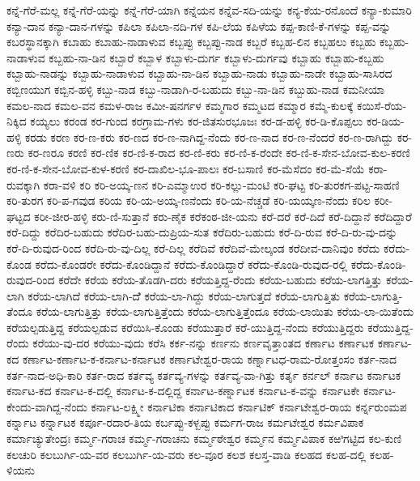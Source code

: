 {ಕನ್ನೆ-ಗೆರೆ-ಮಲ್ಲ
ಕನ್ನೆ-ಗೆರೆ-ಯನ್ನು
ಕನ್ನೆ-ಗೆರೆ-ಯಾಗಿ
ಕನ್ನೆಯನ
ಕನ್ನೆವ-ಸದಿ-ಯನ್ನು
ಕನ್ಯ-ಕೆಯ-ರನೊಂದೆ
ಕನ್ಯಾ-ಕುಮಾರಿ
ಕನ್ಯಾ-ದಾನ
ಕನ್ಯಾ-ದಾನ-ಗಳನ್ನು
ಕಪಿಲಾ
ಕಪಿಲಾ-ನದಿ-ಗಳ
ಕಪಿ-ಲೆಯ
ಕಪಿಳೆಯ
ಕಪ್ಪ-ಕಾಣಿ-ಕೆ-ಗಳನ್ನು
ಕಪ್ಪ-ವನ್ನು
ಕಬರಸ್ಥಾನಕ್ಕಾಗಿ
ಕಬಾಹು
ಕಬಾಹು-ನಾಡಾಳುವ
ಕಬ್ಬಪ್ಪು
ಕಬ್ಬಪ್ಪು-ನಾಡ
ಕಬ್ಬರೆ
ಕಬ್ಬಹ-ಲಿನ
ಕಬ್ಬಹಲು
ಕಬ್ಬಹು
ಕಬ್ಬಹು-ನಾಡಾಳುವ
ಕಬ್ಬಹು-ನಾ-ಡಿನ
ಕಬ್ಬಾರೆ
ಕಬ್ಬಾಳ
ಕಬ್ಬಾಳು-ದುರ್ಗ
ಕಬ್ಬಾಳು-ದುರ್ಗವು
ಕಬ್ಬಾಹು
ಕಬ್ಬಾಹು-ಕಬ್ಬಹು
ಕಬ್ಬಾಹು-ನಾಡನ್ನು
ಕಬ್ಬಾಹು-ನಾಡಾಳುವ
ಕಬ್ಬಾಹು-ನಾ-ಡಿನ
ಕಬ್ಬಾಹು-ನಾಡು
ಕಬ್ಬಾಹು-ನಾಡೇ
ಕಬ್ಬಾಹು-ಸಾಸಿರದ
ಕಬ್ಬಿಣಯುಗ
ಕಬ್ಬಿನ-ಹಳ್ಳಿ
ಕಬ್ಬು-ನಾಡ
ಕಬ್ಬು-ನಾಡಾಗಿ-ರ-ಬಹುದು
ಕಬ್ಬು-ನಾ-ಡಿನ
ಕಬ್ಬುಹು-ನಾಡ
ಕಮನೀಯಾ
ಕಮಲ-ನಾದ
ಕಮಲ-ವನ
ಕಮಳ-ರಾಜ
ಕಮೀ-ಷನರ್ಗಳ
ಕಮ್ಮಗಾರ
ಕಮ್ಮಟದ
ಕಮ್ಮಾರ
ಕಮ್ಮೆ-ಕುಲಕ್ಕೆ
ಕಯಿಸೆ-ರೆಯ-ನಿಕ್ಕಿದ
ಕಯ್ಯಲು
ಕರಂಡ
ಕರ-ಗುಂದ
ಕರಗ್ರಾಮ-ಗಳು
ಕರ-ಜಿತಸುರಭೂಜಃ
ಕರ-ಡ-ಹಳ್ಳಿ
ಕರ-ಡಿ-ಕೊಪ್ಪಲು
ಕರ-ಡಿಯ-ಹಳ್ಳಿ
ಕರಡು
ಕರಣ
ಕರ-ಣ-ಕರು
ಕರ-ಣದ
ಕರ-ಣ-ನಾಗಿದ್ದ-ನೆಂದು
ಕರ-ಣ-ನಾದ
ಕರ-ಣ-ನೆಂದರೆ
ಕರ-ಣ-ರಾಗಿದ್ದು
ಕರ-ಣರು
ಕರ-ಣರೂ
ಕರಣಿ
ಕರ-ಣಿಕ
ಕರ-ಣಿ-ಕ-ರಾದ
ಕರ-ಣಿ-ಕರು
ಕರ-ಣಿ-ಕ-ರೆಂದೇ
ಕರ-ಣಿ-ಕ-ಸೇನ-ಬೋವ-ಕುಲ-ಕರಣಿ
ಕರ-ಣಿ-ಕ-ಸೇನ-ಬೋವ-ಕುಳ-ಕರಣಿ
ಕರ-ದಾಖಿಲ-ಭೂ-ಪಾಲಃ
ಕರ-ಬಸಾಣಿ
ಕರ-ಮೆಸೆದಂ
ಕರ-ಮೆ-ಸೆಯೆ
ಕರಾ-ರುವಕ್ಕಾಗಿ
ಕರಾ-ವಳಿ
ಕರಿ
ಕರಿ-ಅಯ್ಕ-ಣನ
ಕರಿ-ಎಮ್ಮಾಉರ
ಕರಿ-ಕಲ್ಲು-ಮಂಟಿ
ಕರಿ-ಘಟ್ಟ
ಕರಿ-ತುರಕಗ-ಪಟ್ಟ-ಸಾಹಣಿ
ಕರಿ-ತುರಗ
ಕರಿ-ಪ-ಗವುಡ
ಕರಿಯ
ಕರಿ-ಯ-ಅಯ್ಕ-ಣನೆಂದು
ಕರಿ-ಯ-ನೆಚ್ಚಡೆ
ಕರಿ-ಯಯ್ಕಣ-ನೆಂದು
ಕರಿಲ
ಕರೀ-ಘಟ್ಟದ
ಕರೀ-ಜೀರ-ಹಳ್ಳಿ
ಕರು-ಣಿ-ಸುತ್ತಾನೆ
ಕರು-ಣೈಕ
ಕರೆಕಂಠ-ಜೀ-ಯನು
ಕರೆ-ದರೆ
ಕರೆ-ದಿದೆ
ಕರೆ-ದಿದ್ದಾನೆ
ಕರೆದಿದ್ದಾರೆ
ಕರೆ-ದಿದ್ದು
ಕರೆದಿರ-ಬಹುದು
ಕರೆದಿರ-ಬಹು-ದುಪ್ರಿಯ-ಸುತ
ಕರೆದಿರು-ಬಹುದು
ಕರೆ-ದಿ-ರುವ
ಕರೆ-ದಿ-ರು-ವು-ದನ್ನು
ಕರೆ-ದಿ-ರುವುದ-ರಿಂದ
ಕರೆದಿ-ರು-ವು-ದಿಲ್ಲ
ಕರೆ-ದಿಲ್ಲ
ಕರೆದಿವೆ
ಕರೆದಿವೆ-ಮೇಲ್ಕಂಡ
ಕರೆದೀವ-ದಾನಿವುಂ
ಕರೆದು
ಕರೆದು-ಕೊಂಡ
ಕರೆದು-ಕೊಂಡರೇ
ಕರೆದು-ಕೊಂಡಿದ್ದಾನೆ
ಕರೆದು-ಕೊಂಡಿದ್ದಾರೆ
ಕರೆದು-ಕೊಂಡಿ-ರುವುದ-ರಲ್ಲಿ
ಕರೆದು-ಕೊಂಡಿ-ರುವುದ-ರಿಂದ
ಕರೆದೇ
ಕರೆಯ
ಕರೆಯ-ತೊಡಗಿ-ದರು
ಕರೆಯತ್ತಿದ್ದ-ರೆಂದು
ಕರೆಯ-ಬಹುದು
ಕರೆಯ-ಲಾಗತ್ತಿತ್ತು
ಕರೆಯ-ಲಾಗಿ
ಕರೆಯ-ಲಾಗಿದೆ
ಕರೆಯ-ಲಾಗಿ-ದೆೆ
ಕರೆಯ-ಲಾ-ಗಿದ್ದು
ಕರೆಯ-ಲಾಗುತ್ತದೆ
ಕರೆಯ-ಲಾಗುತ್ತಿತು
ಕರೆಯ-ಲಾಗುತ್ತಿ-ತೆಂದೂ
ಕರೆಯ-ಲಾಗುತ್ತಿತ್ತು
ಕರೆಯ-ಲಾಗುತ್ತಿತ್ತೆಂದು
ಕರೆಯ-ಲಾಗುತ್ತಿತ್ತೆಂದೂ
ಕರೆಯ-ಲಾಯಿತು
ಕರೆಯ-ಲಾ-ಯಿತೆಂದು
ಕರೆಯಲ್ಪಡುತ್ತಿದ್ದ
ಕರೆಯಲ್ಪಡುವ
ಕರೆಯಿಸಿ-ಕೊಂಡು
ಕರೆಯುತ್ತಾರೆ
ಕರೆ-ಯುತ್ತಿದ್ದ-ನೆಂದು
ಕರೆಯುತ್ತಿದ್ದರು
ಕರೆಯುತ್ತಿದ್ದ-ರೆಂದು
ಕರೆಯು-ವು-ದರ
ಕರೆಯು-ವುದು
ಕರೆಸಿ
ಕರ್ಕ-ನನ್ನು
ಕರ್ಣನು
ಕರ್ಣವೃತ್ತಾಂತದ
ಕರ್ಣಾಟ
ಕರ್ಣಾಟಕ
ಕರ್ಣಾಟ-ಕದ
ಕರ್ಣಾಟ-ಕರ್ಣಾಟ-ಕ-ಕರ್ನಾಟ-ಕರ್ನಾಟಕ
ಕರ್ಣಾಟೇಶ್ವರ-ರಾಯ
ಕರ್ಣ್ನಾಟಧ-ರಾಮ-ರೋತ್ತಂಸಂ
ಕರ್ತ-ನಾದ
ಕರ್ತ-ನಾದ-ಅಧಿ-ಕಾರಿ
ಕರ್ತ-ರಾದ
ಕರ್ತವ್ಯ
ಕರ್ತವ್ಯ-ಗಳನ್ನು
ಕರ್ತವ್ಯ-ವಾ-ಗಿತ್ತು
ಕರ್ತೃ
ಕರ್ನಲ್
ಕರ್ನಾಟ
ಕರ್ನಾಟಕ
ಕರ್ನಾಟ-ಕದ
ಕರ್ನಾಟ-ಕ-ದಲ್ಲಿ
ಕರ್ನಾಟ-ಕ-ದಲ್ಲಿದ್ದ
ಕರ್ನಾಟ-ಕರ್ಣ್ನಾಟಕ
ಕರ್ನಾಟ-ಕ-ವನ್ನು
ಕರ್ನಾಟಕೇ
ಕರ್ನಾಟ-ಕೇಂದು-ವಾಗಿದ್ದ-ನೆಂದು
ಕರ್ನಾಟ-ಲಕ್ಷ್ಮೀ
ಕರ್ನಾಟಿಕಾ
ಕರ್ನಾಟಿಕಾದ
ಕರ್ನಾಟಿಕ್
ಕರ್ನಾಟೇಶ್ವರ-ರಾಯ
ಕರ್ನ್ನರುಂಮಪ
ಕರ್ನ್ನಾಟ
ಕರ್ನ್ನಾಟಕ
ಕರ್ಪೂ-ರದಾರ-ತಿಯ
ಕರ್ಬಪ್ಪು-ಕಳ್ಬಪ್ಪು
ಕರ್ಮಗ-ರಾಜ
ಕರ್ಮಟೇಶ್ವರ
ಕರ್ಮವಿಪಾಕ
ಕರ್ಮಾಚ್ಯುತೇಂದ್ರಃ
ಕರ್ಮ್ಮ-ಗರಾಚ
ಕರ್ಮ್ಮ-ಗರಾಚನು
ಕರ್ಮ್ಮಠೇಶ್ವರ
ಕರ್ಮ್ಮನ
ಕರ್ಮ್ಮವಿಪಾಕ
ಕಱಿಗಟ್ಟಿದ
ಕಲ-ಕುಣಿ
ಕಲಚುರಿ
ಕಲಬುರ್ಗಿ-ಯ-ವರ
ಕಲಬುರ್ಗಿ-ಯ-ವರು
ಕಲ-ವೂರ
ಕಲಶ
ಕಲಸ್ತ-ವಾಡಿ
ಕಲಹದ
ಕಲಹ-ದಲ್ಲಿ
ಕಲಹ-ಳಿಯನು
}
